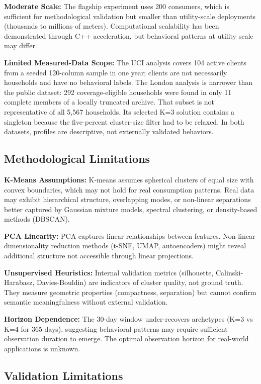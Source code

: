 \documentclass[11pt,a4paper]{article}
\begin{document}
\textbf{Moderate Scale:} The flagship experiment uses 200 consumers, which is sufficient for methodological validation but smaller than utility-scale deployments (thousands to millions of meters). Computational scalability has been demonstrated through C++ acceleration, but behavioral patterns at utility scale may differ.

\textbf{Limited Measured-Data Scope:} The UCI analysis covers 104 active clients from a seeded 120-column sample in one year; clients are not necessarily households and have no behavioral labels. The London analysis is narrower than the public dataset: 292 coverage-eligible households were found in only 11 complete members of a locally truncated archive. That subset is not representative of all 5,567 households. Its selected K=3 solution contains a singleton because the five-percent cluster-size filter had to be relaxed. In both datasets, profiles are descriptive, not externally validated behaviors.

\subsection{Methodological Limitations}

\textbf{K-Means Assumptions:} K-means assumes spherical clusters of equal size with convex boundaries, which may not hold for real consumption patterns. Real data may exhibit hierarchical structure, overlapping modes, or non-linear separations better captured by Gaussian mixture models, spectral clustering, or density-based methods (DBSCAN).

\textbf{PCA Linearity:} PCA captures linear relationships between features. Non-linear dimensionality reduction methods (t-SNE, UMAP, autoencoders) might reveal additional structure not accessible through linear projections.

\textbf{Unsupervised Heuristics:} Internal validation metrics (silhouette, Calinski-Harabasz, Davies-Bouldin) are indicators of cluster quality, not ground truth. They measure geometric properties (compactness, separation) but cannot confirm semantic meaningfulness without external validation.

\textbf{Horizon Dependence:} The 30-day window under-recovers archetypes (K=3 vs K=4 for 365 days), suggesting behavioral patterns may require sufficient observation duration to emerge. The optimal observation horizon for real-world applications is unknown.

\subsection{Validation Limitations}
\end{document}
